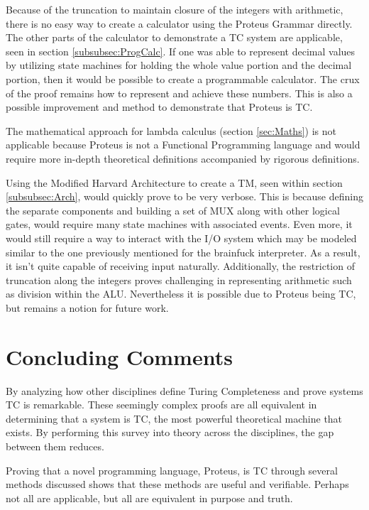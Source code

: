 Because of the truncation to maintain closure of the integers with arithmetic, there is no easy way to create a calculator using the Proteus Grammar directly.
The other parts of the calculator to demonstrate a TC system are applicable, seen in section \ref{subsubsec:ProgCalc}.
If one was able to represent decimal values by utilizing state machines for holding the whole value portion and the decimal portion, then it would be possible to create a programmable calculator.
The crux of the proof remains how to represent and achieve these numbers.
This is also a possible improvement and method to demonstrate that Proteus is TC.

The mathematical approach for lambda calculus (section \ref{sec:Maths}) is not applicable because Proteus is not a Functional Programming language and would require more in-depth theoretical definitions accompanied by rigorous definitions.

Using the Modified Harvard Architecture to create a TM, seen within section \ref{subsubsec:Arch}, would quickly prove to be very verbose.
This is because defining the separate components and building a set of MUX along with other logical gates, would require many state machines with associated events.
Even more, it would still require a way to interact with the I/O system which may be modeled similar to the one previously mentioned for the brainfuck interpreter.
As a result, it isn't quite capable of receiving input naturally.
Additionally, the restriction of truncation along the integers proves challenging in representing arithmetic such as division within the ALU.
Nevertheless it is possible due to Proteus being TC, but remains a notion for future work.

\section{Concluding Comments}\label{sec:ConclComm}

By analyzing how other disciplines define Turing Completeness and prove systems TC is remarkable.
These seemingly complex proofs are all equivalent in determining that a system is TC, the most powerful theoretical machine that exists.
By performing this survey into theory across the disciplines, the gap between them reduces.

Proving that a novel programming language, Proteus, is TC through several methods discussed shows that these methods are useful and verifiable.
Perhaps not all are applicable, but all are equivalent in purpose and truth.
